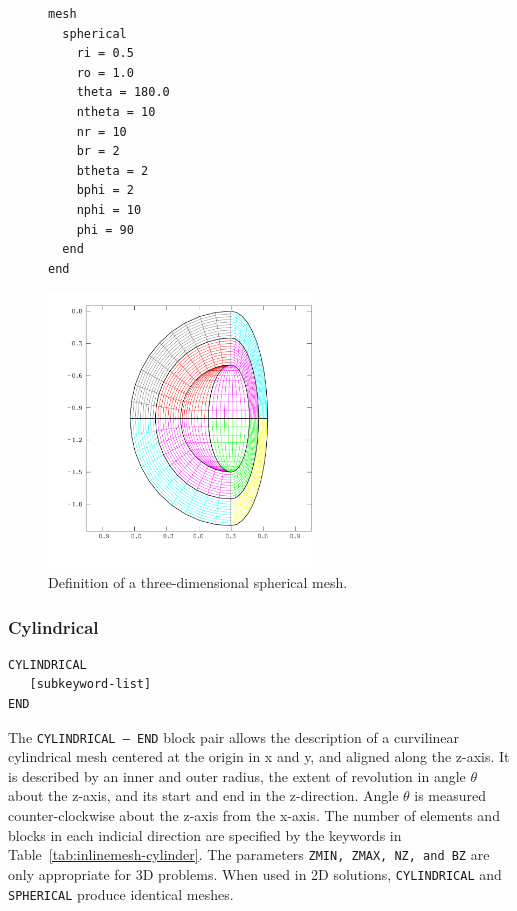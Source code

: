 \begin{figure}[htb]
\centering
  \begin{minipage}[c]{0.4\linewidth}
    \centering
{\ttfamily \begin{verbatim}
mesh
  spherical
    ri = 0.5
    ro = 1.0
    theta = 180.0
    ntheta = 10
    nr = 10
    br = 2
    btheta = 2
    bphi = 2
    nphi = 10
    phi = 90
  end
end
\end{verbatim}}
  \end{minipage}%
  \hfil
  \begin{minipage}[c]{0.6\linewidth}
    \centering
      \includegraphics[width=2.75in]{figures/str_inline_sphere}
  \end{minipage}
  \caption{Definition of a three-dimensional spherical mesh.}
  \label{fig:str_inline_sphere}
\end{figure}

\clearpage
\subsubsection{Cylindrical}
{\ttfamily \begin{verbatim}
CYLINDRICAL
   [subkeyword-list]
END
\end{verbatim}
}

The \texttt{CYLINDRICAL -- END} block pair allows the description of a
curvilinear cylindrical mesh centered at the origin in x and y, and
aligned along the z-axis.  It is described by an inner and outer
radius, the extent of revolution in angle $\theta$ about the z-axis,
and its start and end in the z-direction.  Angle $\theta$ is measured
counter-clockwise about the z-axis from the x-axis.  The number of
elements and blocks in each indicial direction are specified by the
keywords in Table~\ref{tab:inlinemesh-cylinder}.  The parameters
\texttt{ZMIN, ZMAX, NZ, and BZ} are only appropriate for 3D
problems.  When used in 2D solutions, \texttt{CYLINDRICAL} and
\texttt{SPHERICAL} produce identical meshes.

